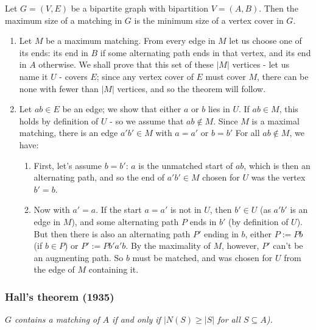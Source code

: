 \documentclass[11pt]{book}
\begin{document}
Let $G = (V,E)$ be a bipartite graph with bipartition $V = (A, B)$. Then the maximum size of a matching in $G$ is the minimum size of a vertex cover in $G$.
	\begin{enumerate}
		\item Let $M$ be a maximum matching. From every edge in $M$ let us choose one of its ends: its end in $B$ if some alternating path ends in that vertex, and its end in $A$ otherwise. We shall prove that this set of these $|M|$ vertices - let us name it $U$ - covers $E$; since any vertex cover of $E$ must cover $M$, there can be none with fewer than $|M|$ vertices, and so the theorem will follow.
		\item Let $ab \in E$ be an edge; we show that either $a$ or $b$ lies in $U$. If $ab \in M$, this holds by definition of $U$ - so we assume that $ab \notin M$. Since $M$ is a maximal matching, there is an edge $a'b' \in M$ with $a = a'$ or $b = b'$ For all $ab \notin M$, we have:
			\begin{enumerate} 
				\item First, let's assume $b = b'$: $a$ is the unmatched start of $ab$, which is then an alternating path, and so the end of $a'b' \in M$ chosen for $U$ was the vertex $b' = b$.
				\item Now with $a' = a$. If the start $a = a'$  is not in $U$, then $b' \in U$ (as $a'b'$ is an edge in $M$), and some alternating path $P$ ends in $b'$ (by definition of $U$). But then there is also an alternating path $P'$ ending in $b$, either $P := Pb$ (if $b \in P$) or $P' := Pb'a'b$. By the maximality of $M$, however, $P'$ can't be an augmenting path. So $b$ must be matched, and was chosen for $U$ from the edge of $M$ containing it.
			\end{enumerate}
	\end{enumerate}
	
\subsubsection{Hall's theorem (1935)} 

\textit{$G$ contains a matching of $A$ if and only if $|N(S) \geq |S|$ for all $S \subseteq A$).}\\
\end{document}
